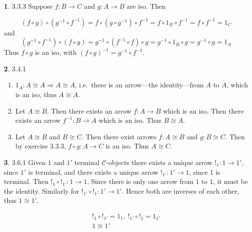 \documentclass{article}
\theoremstyle{definition}
\theoremstyle{definition}
\theoremstyle{definition}
\newtheorem{solution-internal}{}[subsection]
\newenvironment{solution}{
  \begin{solution-internal}
}{
  \end{solution-internal}
}
\begin{document}
\begin{solution}
  3.3.3
  Suppose $f\colon B \to C$ and $g\colon A \to B$ are iso. Then 
  
  \[ (f \circ g) \circ (g^{-1} \circ f^{-1}) = f \circ (g \circ g^{-1}) \circ
  f^{-1} = f \circ 1_B \circ f^{-1} = f \circ f^{-1} = 1_C \]
  and 
  \[  (g^{-1} \circ f^{-1}) \circ (f \circ g) = g^{-1} \circ (f^{-1} \circ f)
  \circ g = g^{-1} \circ 1_B \circ g =  g^{-1} \circ g = 1_A \]
  Thus $f \circ g$ is an iso, with $(f \circ g)^{-1} = g^{-1} \circ f^{-1}$.
\end{solution}

\begin{solution}
  3.4.1 
  \begin{enumerate}[label=\roman*.]
    \item $1_A\colon A \cong A \Rightarrow A \cong A$, i.e.\ there is an arrow---the identity---from $A$ to $A$, which is an iso, thus $A \cong A$.
    \item Let $A \cong B$. Then there exists an arrow $f \colon A \to B$ which
      is an iso. Then there exists an arrow $f^{-1} \colon B \to A$ which is an
      iso. Thus $B \cong A$.
    \item Let $A \cong B$ and $B \cong C$. Then there exist arrows $f \colon A
      \cong B$ and $g\colon B \cong C$. Then by exercise 3.3.3, $f \circ g
      \colon A \to C$ is an iso. Thus $A \cong C$.
  \end{enumerate}
\end{solution}

\begin{solution}
  3.6.1 Given $1$ and $1'$ terminal $\mathscr{C}$-objects there exists a unique arrow $!_1
  \colon 1 \to 1'$, since $1'$ is terminal, and there exists a unique arrow
  $!_{1'} \colon 1' \to 1$, since 1 is terminal. Then $!_1 \circ !_{1'}\colon
  1 \to 1$. Since there is only one arrow from $1$ to $1$, it must be the
  identity. Similarly for $!_{1'} \circ !_1 \colon 1' \to 1'$. Hence both are
  inverses of each other, thus $1 \cong 1'$.

  \begin{center}
  \begin{gather*}
  !_1 \circ !_{1'} = 1_1,~!_{1'} \circ !_1 = 1_{1'}  \\
  1 \cong 1'
  \end{gather*}
  \end{center}
\end{solution}
\end{document}
